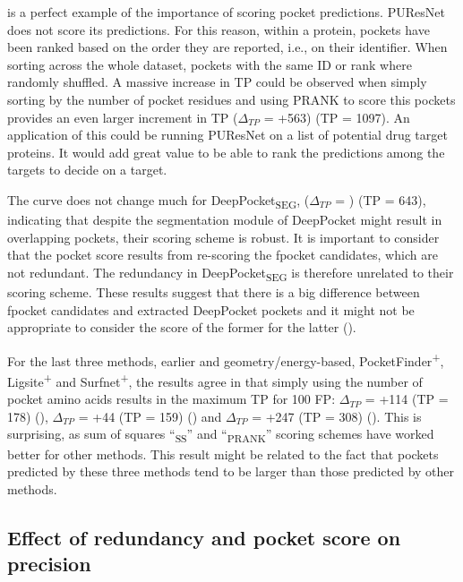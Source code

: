  is a perfect example of the importance of scoring pocket predictions. PUResNet does not score its predictions. For this reason, within a protein, pockets have been ranked based on the order they are reported, i.e., on their identifier. When sorting across the whole dataset, pockets with the same ID or rank where randomly shuffled. A massive increase in TP could be observed when simply sorting by the number of pocket residues and using PRANK to score this pockets provides an even larger increment in TP ($\Delta_{TP}$ = +563) (TP = 1097). An application of this could be running PUResNet on a list of potential drug target proteins. It would add great value to be able to rank the predictions among the targets to decide on a target.

The curve does not change much for DeepPocket\textsubscript{SEG}, ($\Delta_{TP}$ = ) (TP = 643), indicating that despite the segmentation module of DeepPocket might result in overlapping pockets, their scoring scheme is robust. It is important to consider that the pocket score results from re-scoring the fpocket candidates, which are not redundant. The redundancy in DeepPocket\textsubscript{SEG} is therefore unrelated to their scoring scheme. These results suggest that there is a big difference between fpocket candidates and extracted DeepPocket pockets and it might not be appropriate to consider the score of the former for the latter ().

For the last three methods, earlier and geometry/energy-based, PocketFinder\textsuperscript{+}, Ligsite\textsuperscript{+} and Surfnet\textsuperscript{+}, the results agree in that simply using the number of pocket amino acids results in the maximum TP for 100 FP: $\Delta_{TP}$ = +114 (TP = 178) (), $\Delta_{TP}$ = +44 (TP = 159) () and $\Delta_{TP}$ = +247 (TP = 308) (). This is surprising, as sum of squares ``\textsubscript{SS}'' and ``\textsubscript{PRANK}'' scoring schemes have worked better for other methods. This result might be related to the fact that pockets predicted by these three methods tend to be larger than those predicted by other methods.

\subsection{Effect of redundancy and pocket score on precision}

